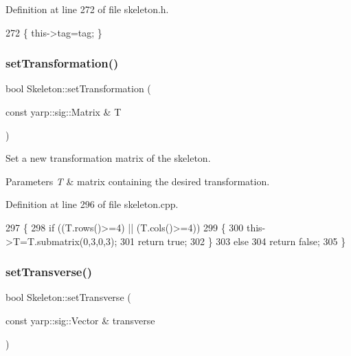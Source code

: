 Definition at line 272 of file skeleton.\+h.


\begin{DoxyCode}
272 \{ this->tag=tag; \}
\end{DoxyCode}
\mbox{\label{classassistive__rehab_1_1Skeleton_a3486cbd7f59e75c1d9ef26cbc05bb72f}} 
\subsubsection{\texorpdfstring{set\+Transformation()}{setTransformation()}}
{\footnotesize\ttfamily bool Skeleton\+::set\+Transformation (\begin{DoxyParamCaption}\item[{const yarp\+::sig\+::\+Matrix \&}]{T }\end{DoxyParamCaption})}



Set a new transformation matrix of the skeleton. 


\begin{DoxyParams}{Parameters}
{\em T} & matrix containing the desired transformation. \\
\hline
\end{DoxyParams}


Definition at line 296 of file skeleton.\+cpp.


\begin{DoxyCode}
297 \{
298     \textcolor{keywordflow}{if} ((T.rows()>=4) || (T.cols()>=4))
299     \{
300         this->T=T.submatrix(0,3,0,3);
301         \textcolor{keywordflow}{return} \textcolor{keyword}{true};
302     \}
303     \textcolor{keywordflow}{else}
304         \textcolor{keywordflow}{return} \textcolor{keyword}{false};
305 \}
\end{DoxyCode}
\mbox{\label{classassistive__rehab_1_1Skeleton_a1aeba05a17363afc08c30397d17375df}} 
\subsubsection{\texorpdfstring{set\+Transverse()}{setTransverse()}}
{\footnotesize\ttfamily bool Skeleton\+::set\+Transverse (\begin{DoxyParamCaption}\item[{const yarp\+::sig\+::\+Vector \&}]{transverse }\end{DoxyParamCaption})}



